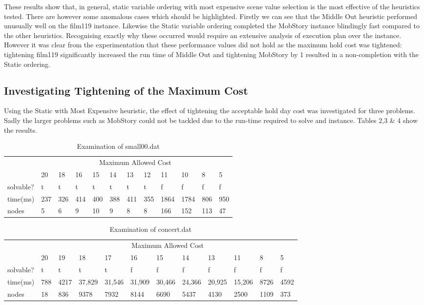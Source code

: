 \documentclass{article}
\begin{document}
These results show that, in general, static variable ordering with most expensive scene value selection is the most effective of the heuristics tested. There are however some anomalous cases which should be highlighted. Firstly we can see that the Middle Out heuristic performed unusually well on the film119 instance. Likewise the Static variable ordering completed the MobStory instance blindingly fast compared to the other heuristics. Recognising exactly why these occurred would require an extensive analysis of execution plan over the instance. However it was clear from the experimentation that these performance values did not hold as the maximum hold cost was tightened: tightening film119 significantly increased the run time of Middle Out and tightening MobStory by 1 resulted in a non-completion with the Static ordering.

\subsection{Investigating Tightening of the Maximum Cost}
Using the Static with Most Expensive heuristic, the effect of tightening the acceptable hold day cost was investigated for three problems. Sadly the larger problems such as MobStory could not be tackled due to the run-time required to solve and instance. Tables 2,3 \& 4 show the results.\\

\begin{table}[h]\footnotesize
\centering
\begin{tabularx}{\textwidth}{|X|X|X|X|X|X|X|X|X|X|X|X|}
\hline
 & \multicolumn{11}{c|}{Maximum Allowed Cost} \\ \cline{2-12}
 & 20 & 18 & 16 & 15 & 14 & 13 & 12 & 11 & 10 & 8 & 5  \\
\hline
solvable? & t & t & t & t & t & t & t & f & f & f & f  \\
\hline
time(ms) & 237 & 326 & 414 & 400 & 388 & 411 & 355 & 1864 & 1784 & 806 & 950  \\
\hline
nodes & 5 & 6 & 9 & 10 & 9 & 8 & 8 & 166 & 152 & 113  & 47  \\
\hline
\end{tabularx}
\caption{Examination of small00.dat}
\end{table}

\begin{table}[h]\footnotesize
\centering
\label{concertTable}
\begin{tabularx}{\textwidth}{|X|X|X|X|X|X|X|X|X|X|X|X|}
\hline
 & \multicolumn{11}{c|}{Maximum Allowed Cost} \\ \cline{ 2 - 12}
 & 20 & 19 & 18 & 17 & 16 & 15 & 14 & 13 & 11 & 8 & 5\\
\hline
solvable? & t & t & t & t & f & f & f & f & f & f & f  \\
\hline
time(ms) & 788 & 4217 & 37,829 & 31,546 & 31,909 & 30,466 & 24,366 & 20,925 & 15,206 & 8726 & 4592 \\
\hline
nodes & 18 & 836 & 9378 & 7932 & 8144 & 6690 & 5437 & 4130 & 2500 & 1109 & 373 \\
\hline
\end{tabularx}
\caption{Examination of concert.dat}
\end{table}
\end{document}
